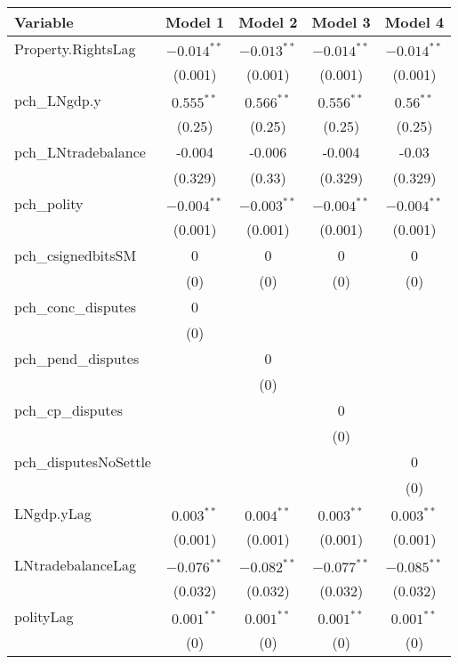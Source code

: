 \begin{table}[ht]
\centering
\begin{tabular}{lcccc}
 Variable & Model 1 & Model 2 & Model 3 & Model 4 \\ 
  \hline
\hline
Property.RightsLag & $-0.014^{\ast\ast}$ & $-0.013^{\ast\ast}$ & $-0.014^{\ast\ast}$ & $-0.014^{\ast\ast}$ \\ 
   & (0.001) & (0.001) & (0.001) & (0.001) \\ 
   \hline
pch\_LNgdp.y & $0.555^{\ast\ast}$ & $0.566^{\ast\ast}$ & $0.556^{\ast\ast}$ & $0.56^{\ast\ast}$ \\ 
   & (0.25) & (0.25) & (0.25) & (0.25) \\ 
  pch\_LNtradebalance & -0.004 & -0.006 & -0.004 & -0.03 \\ 
   & (0.329) & (0.33) & (0.329) & (0.329) \\ 
  pch\_polity & $-0.004^{\ast\ast}$ & $-0.003^{\ast\ast}$ & $-0.004^{\ast\ast}$ & $-0.004^{\ast\ast}$ \\ 
   & (0.001) & (0.001) & (0.001) & (0.001) \\ 
  pch\_csignedbitsSM & 0 & 0 & 0 & 0 \\ 
   & (0) & (0) & (0) & (0) \\ 
  pch\_conc\_disputes & 0 &  &  &  \\ 
   & (0) &  &  &  \\ 
  pch\_pend\_disputes &  & 0 &  &  \\ 
   &  & (0) &  &  \\ 
  pch\_cp\_disputes &  &  & 0 &  \\ 
   &  &  & (0) &  \\ 
  pch\_disputesNoSettle &  &  &  & 0 \\ 
   &  &  &  & (0) \\ 
   \hline
LNgdp.yLag & $0.003^{\ast\ast}$ & $0.004^{\ast\ast}$ & $0.003^{\ast\ast}$ & $0.003^{\ast\ast}$ \\ 
   & (0.001) & (0.001) & (0.001) & (0.001) \\ 
  LNtradebalanceLag & $-0.076^{\ast\ast}$ & $-0.082^{\ast\ast}$ & $-0.077^{\ast\ast}$ & $-0.085^{\ast\ast}$ \\ 
   & (0.032) & (0.032) & (0.032) & (0.032) \\ 
  polityLag & $0.001^{\ast\ast}$ & $0.001^{\ast\ast}$ & $0.001^{\ast\ast}$ & $0.001^{\ast\ast}$ \\ 
   & (0) & (0) & (0) & (0) \\ 

\end{tabular}
\end{table}
